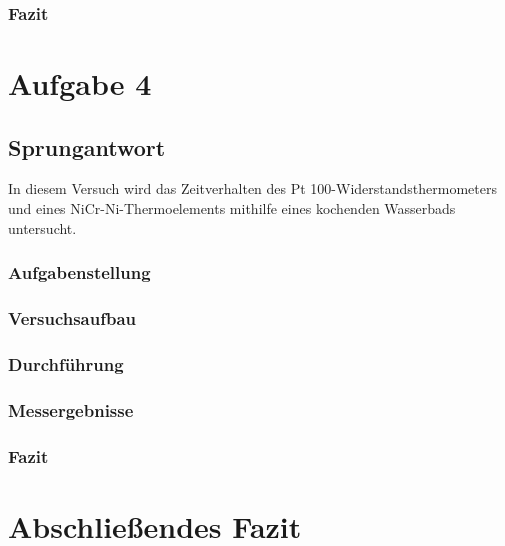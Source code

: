 \documentclass[a4paper,11pt,oneside]{article}
\begin{document}
\subsubsection{Fazit}


\section{Aufgabe 4}
\subsection{Sprungantwort}
In diesem Versuch wird das Zeitverhalten des Pt 100-Widerstandsthermometers und eines NiCr-Ni-Thermoelements mithilfe eines kochenden Wasserbads untersucht. 
\subsubsection{Aufgabenstellung}
\subsubsection{Versuchsaufbau}
\subsubsection{Durchführung}
\subsubsection{Messergebnisse}
\subsubsection{Fazit}

\section{Abschließendes Fazit}
\end{document}
